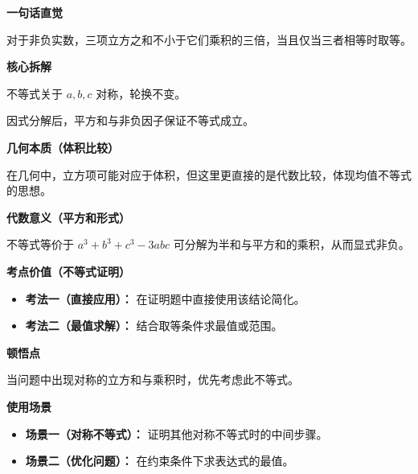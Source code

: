 \begin{explanationbox}
\textbf{\textcolor{CExplanation}{一句话直觉}}

对于非负实数，三项立方之和不小于它们乘积的三倍，当且仅当三者相等时取等。

\medskip
\textbf{\textcolor{CExplanation}{核心拆解}}
\begin{description}[style=nextline, leftmargin=2.8em, labelsep=0.5em, itemsep=0.45em]
    \item[\textbf{要点一（对称结构）：}] 不等式关于 $a, b, c$ 对称，轮换不变。
    \item[\textbf{要点二（非负保障）：}] 因式分解后，平方和与非负因子保证不等式成立。
\end{description}

\medskip
\textbf{\textcolor{CExplanation}{几何本质（体积比较）}}

在几何中，立方项可能对应于体积，但这里更直接的是代数比较，体现均值不等式的思想。

\medskip
\textbf{\textcolor{CExplanation}{代数意义（平方和形式）}}

不等式等价于 $a^3+b^3+c^3-3abc$ 可分解为半和与平方和的乘积，从而显式非负。

\medskip
\textbf{\textcolor{CExplanation}{考点价值（不等式证明）}}
\begin{itemize}[leftmargin=*, itemsep=0.5em, topsep=0.4em]
    \item \textbf{考法一（直接应用）：} 在证明题中直接使用该结论简化。
    \item \textbf{考法二（最值求解）：} 结合取等条件求最值或范围。
\end{itemize}

\medskip
\textbf{\textcolor{CExplanation}{顿悟点}}

当问题中出现对称的立方和与乘积时，优先考虑此不等式。

\medskip
\textbf{\textcolor{CExplanation}{使用场景}}
\begin{itemize}[leftmargin=*, itemsep=0.5em, topsep=0.4em]
    \item \textbf{场景一（对称不等式）：} 证明其他对称不等式时的中间步骤。
    \item \textbf{场景二（优化问题）：} 在约束条件下求表达式的最值。
\end{itemize}
\end{explanationbox}
